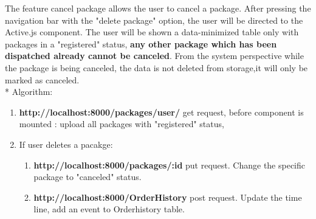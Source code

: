 The feature cancel package allows the user to cancel a package.
After pressing the navigation bar with the "delete package" option, the user will be directed to the Active.js component.\newline
The user will be shown a data-minimized table only with packages in a "registered" status, \textbf{any other package which has been dispatched already cannot be canceled}.\newline
From the system perspective while the package is being canceled, the data is not deleted from storage,it will only be marked as canceled.\\*
Algorithm:
\begin{enumerate}
  \item \textbf{http://localhost:8000/packages/user/}  get request, before component is mounted : upload all packages with "registered" status,
  \item If user deletes a pacakge:
  \begin{enumerate}
      \item \textbf {http://localhost:8000/packages/:id}  put request. Change the specific package to "canceled" status.
      \item \textbf {http://localhost:8000/OrderHistory}  post request. Update the time line, add an event to Orderhistory table.
\end{enumerate}
\end{enumerate}


